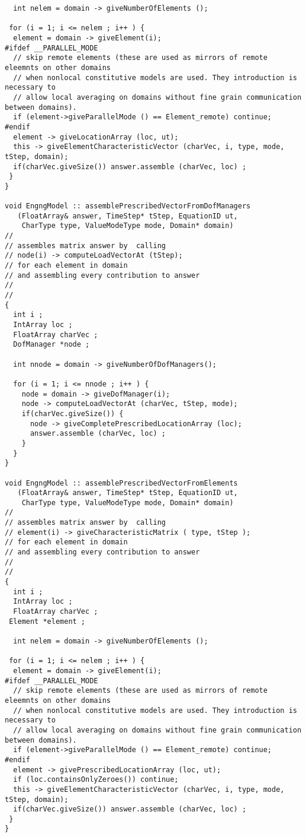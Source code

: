 \documentclass[12pt,draft]{article}
\begin{document}
{\begin{verbatim}
  int nelem = domain -> giveNumberOfElements ();

 for (i = 1; i <= nelem ; i++ ) {
  element = domain -> giveElement(i);
#ifdef __PARALLEL_MODE
  // skip remote elements (these are used as mirrors of remote eleemnts on other domains
  // when nonlocal constitutive models are used. They introduction is necessary to
  // allow local averaging on domains without fine grain communication between domains).
  if (element->giveParallelMode () == Element_remote) continue;
#endif
  element -> giveLocationArray (loc, ut);
  this -> giveElementCharacteristicVector (charVec, i, type, mode, tStep, domain);
  if(charVec.giveSize()) answer.assemble (charVec, loc) ;
 }  
}

void EngngModel :: assemblePrescribedVectorFromDofManagers 
   (FloatArray& answer, TimeStep* tStep, EquationID ut,
    CharType type, ValueModeType mode, Domain* domain) 
//
// assembles matrix answer by  calling  
// node(i) -> computeLoadVectorAt (tStep); 
// for each element in domain 
// and assembling every contribution to answer
//
//
{
  int i ;
  IntArray loc ;
  FloatArray charVec ;
  DofManager *node ;
  
  int nnode = domain -> giveNumberOfDofManagers();
  
  for (i = 1; i <= nnode ; i++ ) {
    node = domain -> giveDofManager(i);
    node -> computeLoadVectorAt (charVec, tStep, mode);
    if(charVec.giveSize()) {
      node -> giveCompletePrescribedLocationArray (loc);
      answer.assemble (charVec, loc) ;
    }
  }
}

void EngngModel :: assemblePrescribedVectorFromElements 
   (FloatArray& answer, TimeStep* tStep, EquationID ut, 
    CharType type, ValueModeType mode, Domain* domain) 
//
// assembles matrix answer by  calling  
// element(i) -> giveCharacteristicMatrix ( type, tStep );
// for each element in domain 
// and assembling every contribution to answer
//
//
{
  int i ;
  IntArray loc ;
  FloatArray charVec ;
 Element *element ;
 
  int nelem = domain -> giveNumberOfElements ();

 for (i = 1; i <= nelem ; i++ ) {
  element = domain -> giveElement(i);
#ifdef __PARALLEL_MODE
  // skip remote elements (these are used as mirrors of remote eleemnts on other domains
  // when nonlocal constitutive models are used. They introduction is necessary to
  // allow local averaging on domains without fine grain communication between domains).
  if (element->giveParallelMode () == Element_remote) continue;
#endif
  element -> givePrescribedLocationArray (loc, ut);
  if (loc.containsOnlyZeroes()) continue;
  this -> giveElementCharacteristicVector (charVec, i, type, mode, tStep, domain);
  if(charVec.giveSize()) answer.assemble (charVec, loc) ;
 }  
}

\end{verbatim}}
\end{document}

